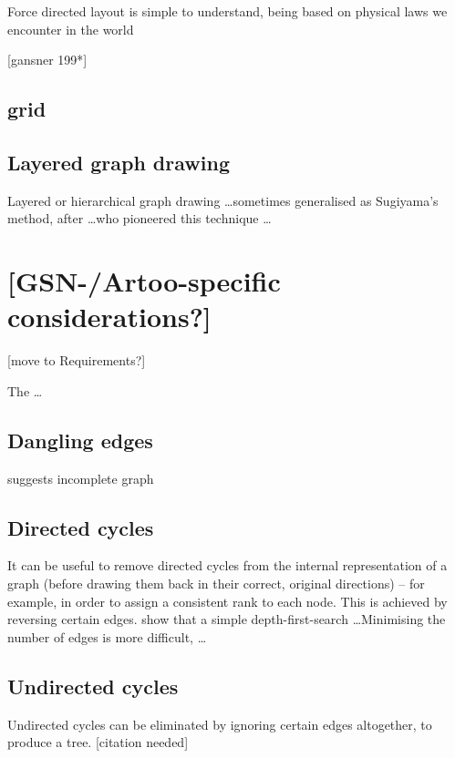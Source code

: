 Force directed layout is simple to understand, being based on physical laws we encounter in the world 


[gansner 199*]

\subsection{grid}




\subsection{Layered graph drawing}

Layered or hierarchical graph drawing  \ldots sometimes generalised as Sugiyama's method, after \ldots who pioneered this technique \ldots 




\section{[GSN-/Artoo-specific considerations?]}

[move to Requirements?]

The  \ldots



\subsection{Dangling edges}

suggests incomplete graph

\subsection{Directed cycles}

It can be useful to remove directed cycles from the internal representation of a graph
(before drawing them back in their correct, original directions)
-- for example, in order to assign a consistent rank to each node.
This is achieved by reversing certain edges.
\citet{gansner1993} show that a simple depth-first-search \ldots  Minimising the number of edges is more difficult, \citeauthor{gansner1993} \ldots

\subsection{Undirected cycles}

Undirected cycles can be eliminated by ignoring certain edges altogether, to produce a tree.  [citation needed]








